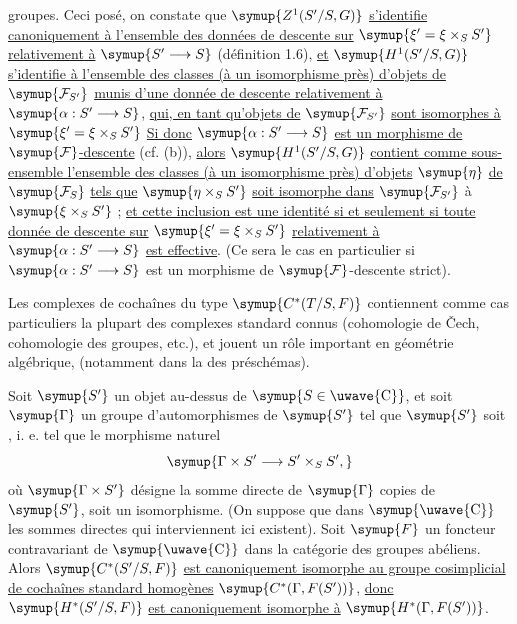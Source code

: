groupes. Ceci posé, on constate que $\symup{Z^1(S'/S,G)}$ \uline{s'identifie
canoniquement à l'ensemble des données de descente sur}
$\symup{\xi'=\xi\times_SS'}$ \uline{relativement à} $\symup{S'\longrightarrow S}$ (définition 1.6),
\uline{et} $\symup{H^1(S'/S,G)}$ \uline{s'identifie à l'ensemble des classes (à un
isomorphisme près) d'objets de} $\symup{\mathcal F_{S'}}$ \uline{munis d'une donnée de descente
relativement à} $\symup{\alpha:S'\longrightarrow S}$, \uline{qui, en tant qu'objets de}
$\symup{\mathcal F_{S'}}$ \uline{sont isomorphes à} $\symup{\xi'=\xi\times_SS'}$ \uline{Si donc} $\symup{\alpha:S'\longrightarrow S}$ \uline{est un morphisme de} $\symup{\mathcal F}$\uline{-descente} (cf. (b)), \uline{alors} $\symup{H^1(S'/S,G)}$ \uline{contient comme sous-ensemble
l'ensemble des classes (à un isomorphisme près) d'objets} $\symup{\eta}$ \uline{de}
$\symup{\mathcal F_S}$ \uline{tels que} $\symup{\eta\times_SS'}$ \uline{soit isomorphe dans}
$\symup{\mathcal F_{S'}}$ à $\symup{\xi\times_SS'}$ ; \uline{et cette inclusion est une identité si
et seulement si toute donnée de descente sur} $\symup{\xi'=\xi\times_SS'}$
\uline{relativement à} $\symup{\alpha:S'\longrightarrow S}$ \uline{est effective}. (Ce sera le cas en
particulier si $\symup{\alpha:S'\longrightarrow S}$ est un morphisme de
$\symup{\mathcal F}$-descente strict).

 Les complexes de cochaînes du type $\symup{C^*(T/S,F)}$ contiennent
comme cas particuliers la plupart des complexes standard connus (cohomologie
de Čech, cohomologie des groupes, etc.), et jouent un rôle important en
géométrie algébrique, (notamment dans la  des préschémas).

 Soit $\symup{S'}$ un objet au-dessus de $\symup{S\in\text{\uwave{C}}}$, et
soit $\symup{\Gamma}$ un groupe d'automorphismes de $\symup{S'}$ tel que $\symup{S'}$ soit
, i. e. tel que le
morphisme naturel
\[
  \symup{\Gamma\times S'\longrightarrow S'\times_SS',}
\]
où $\symup{\Gamma\times S'}$ désigne la somme directe de $\symup{\Gamma}$ copies de $\symup{S'}$, soit
un isomorphisme. (On suppose que dans $\symup{\text{\uwave{C}}}$ les sommes directes qui
interviennent ici existent). Soit $\symup{F}$ un foncteur contravariant de $\symup{\text{\uwave{C}}}$
dans la catégorie des groupes abéliens. Alors $\symup{C^*(S'/S,F)}$ \uline{est canoniquement
isomorphe au groupe cosimplicial de cochaînes standard homogènes}
$\symup{C^*(\Gamma,F(S'))}$, \uline{donc} $\symup{H^*(S'/S,F)}$ \uline{est canoniquement isomorphe à}
$\symup{H^*(\Gamma,F(S'))}$.

